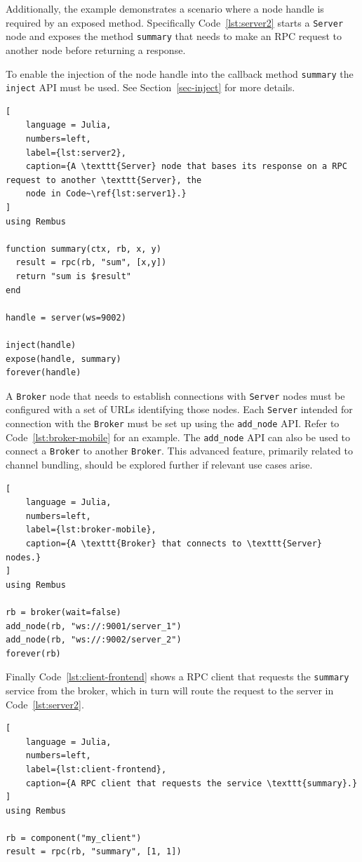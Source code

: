 \documentclass{juliacon}
\begin{document}
Additionally, the example demonstrates a scenario where a node handle is required by an
exposed method. Specifically Code~\ref{lst:server2} starts a \texttt{Server} node and
exposes the method \texttt{summary} that needs to make an RPC request to
another node before returning a response.
\vskip 6pt

To enable the injection of the node handle into the callback method
\texttt{summary} the \texttt{inject} API must be used. See
Section~\ref{sec-inject} for more details.

\begin{lstlisting}[
    language = Julia, 
    numbers=left, 
    label={lst:server2}, 
    caption={A \texttt{Server} node that bases its response on a RPC request to another \texttt{Server}, the
    node in Code~\ref{lst:server1}.}
]
using Rembus

function summary(ctx, rb, x, y)
  result = rpc(rb, "sum", [x,y])  
  return "sum is $result"
end

handle = server(ws=9002)

inject(handle)
expose(handle, summary)
forever(handle)
\end{lstlisting}


A \texttt{Broker} node that needs to establish connections with \texttt{Server} nodes must
be configured with a set of URLs identifying those nodes.
\vskip 6pt
Each \texttt{Server} intended for connection with the \texttt{Broker} must be set up using
the \texttt{add\_node} API. Refer to Code~\ref{lst:broker-mobile} for an example.
\vskip 6pt
The \texttt{add\_node} API can also be used to connect a \texttt{Broker} to another
\texttt{Broker}. This advanced feature, primarily related to channel bundling, should be
explored further if relevant use cases arise.

\begin{lstlisting}[
    language = Julia, 
    numbers=left, 
    label={lst:broker-mobile}, 
    caption={A \texttt{Broker} that connects to \texttt{Server} nodes.}
]
using Rembus

rb = broker(wait=false)
add_node(rb, "ws://:9001/server_1")
add_node(rb, "ws://:9002/server_2")
forever(rb)
\end{lstlisting}

Finally Code~\ref{lst:client-frontend} shows a RPC client that
requests the \texttt{summary} service from the broker, which in turn will route the
request to the server in Code~\ref{lst:server2}.

\begin{lstlisting}[
    language = Julia, 
    numbers=left, 
    label={lst:client-frontend}, 
    caption={A RPC client that requests the service \texttt{summary}.}
]
using Rembus

rb = component("my_client")
result = rpc(rb, "summary", [1, 1])
\end{lstlisting}
\end{document}
